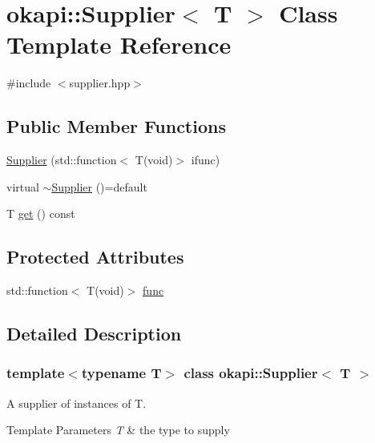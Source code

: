 \hypertarget{classokapi_1_1Supplier}{}\section{okapi\+::Supplier$<$ T $>$ Class Template Reference}
\label{classokapi_1_1Supplier}


{\ttfamily \#include $<$supplier.\+hpp$>$}

\subsection*{Public Member Functions}
\begin{DoxyCompactItemize}
\item 
\mbox{\hyperlink{classokapi_1_1Supplier_a79da50ffa4a1f5b281915fd4200f361f}{Supplier}} (std\+::function$<$ T(void)$>$ ifunc)
\item 
virtual \mbox{\hyperlink{classokapi_1_1Supplier_aa77c64ed86dd8a0e1ea712b085138ae3}{$\sim$\+Supplier}} ()=default
\item 
T \mbox{\hyperlink{classokapi_1_1Supplier_a38d76d4c3dcc19fd74f5349660199efe}{get}} () const
\end{DoxyCompactItemize}
\subsection*{Protected Attributes}
\begin{DoxyCompactItemize}
\item 
std\+::function$<$ T(void)$>$ \mbox{\hyperlink{classokapi_1_1Supplier_aad4dde721930a73ed5077011bab8203c}{func}}
\end{DoxyCompactItemize}


\subsection{Detailed Description}
\subsubsection*{template$<$typename T$>$\newline
class okapi\+::\+Supplier$<$ T $>$}

A supplier of instances of T.


\begin{DoxyTemplParams}{Template Parameters}
{\em T} & the type to supply \\
\hline
\end{DoxyTemplParams}



